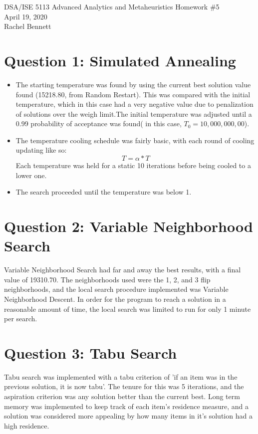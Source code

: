 \documentclass[12pt, letterpaper]{article}
\begin{document}
\begin{center}
\Large DSA/ISE 5113 Advanced Analytics and Metaheuristics
\Large Homework \#5\\
\vspace{3mm}
\normalsize April 19, 2020\\
\vspace{3mm}
\normalsize Rachel Bennett
\end{center}


\section*{Question 1: Simulated Annealing}
\begin{itemize}
\item The starting temperature was found by using the current best solution value found (15218.80, from Random Restart). This was compared with the initial temperature, which in this case had a very negative value due to penalization of solutions over the weigh limit.The initial temperature was adjusted until a 0.99 probability of acceptance was found( in this case, $T_0 =10,000,000,00$).
\item The temperature cooling schedule was fairly basic, with each round of cooling updating like so:
$$ T = \alpha * T$$
Each temperature was held for a static 10 iterations before being cooled to a lower one.
\item The search proceeded until the temperature was below 1. 
\end{itemize}

\section*{Question 2: Variable Neighborhood Search}
Variable Neighborhood Search had far and away the best results, with a final value of 19310.70. The neighborhoods used were the 1, 2, and 3 flip neighborhoods, and the local search procedure implemented was Variable Neighborhood Descent. In order for the program to reach a solution in a reasonable amount of time, the local search was limited to run for only 1 minute per search. 

\section*{Question 3: Tabu Search}

Tabu search was implemented with a tabu criterion of 'if an item was in the previous solution, it is now tabu'. The tenure for this was 5 iterations, and the aspiration criterion was any solution better than the current best. Long term memory was implemented to keep track of each item's residence measure, and a solution was considered more appealing by how many items in it's solution had a high residence. 
\end{document}
